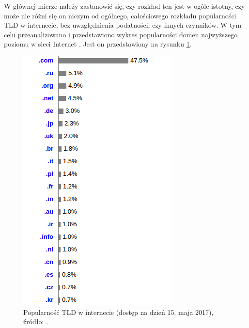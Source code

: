 W głównej mierze należy zastanowić się, czy rozkład ten jest w ogóle istotny, czy może nie różni się on niczym od ogólnego,
całościowego rozkładu popularności TLD w internecie, bez uwzględnienia podatności, czy innych czynników. W tym celu przeanalizowano
i przedstawiono wykres popularności domen najwyższego poziomu w sieci Internet \cite{TLD_popularity}. Jest on przedstawiony na
rysunku \ref{fig:TLD_all}.
\begin{center}
	\begin{figure}
		\centering
		\includegraphics[scale=0.75]{image/TLD_all}
		\caption{Popularność TLD w internecie (dostęp na dzień 15. maja 2017), źródło:  \cite{TLD_popularity}.}
		\label{fig:TLD_all}
	\end{figure}
\end{center}

